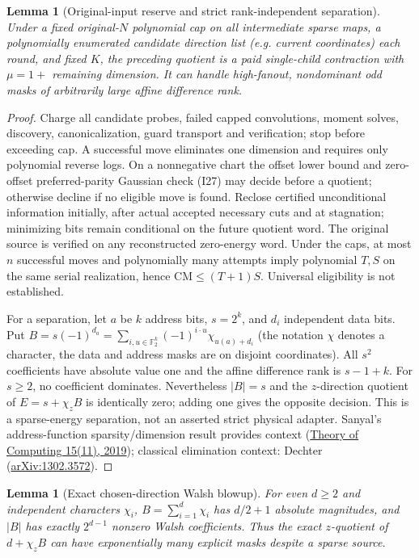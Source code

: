 \documentclass[11pt]{article}
\newtheorem{lemma}[theorem]{Lemma}
\begin{document}
\begin{lemma}[Original-input reserve and strict rank-independent separation]\label{lem:ba21-reserve}
Under a fixed original-$N$ polynomial cap on all intermediate sparse maps, a polynomially enumerated candidate direction list (e.g. current coordinates) each round, and fixed $K$, the preceding quotient is a paid single-child contraction with $\mu=1+$ remaining dimension. It can handle high-fanout, nondominant odd masks of arbitrarily large affine difference rank.
\end{lemma}
\begin{proof}
Charge all candidate probes, failed capped convolutions, moment solves, discovery, canonicalization, guard transport and verification; stop before exceeding cap. A successful move eliminates one dimension and requires only polynomial reverse logs. On a nonnegative chart the offset lower bound and zero-offset preferred-parity Gaussian check (I27) may decide before a quotient; otherwise decline if no eligible move is found. Reclose certified unconditional information initially, after actual accepted necessary cuts and at stagnation; minimizing bits remain conditional on the future quotient word. The original source is verified on any reconstructed zero-energy word. Under the caps, at most $n$ successful moves and polynomially many attempts imply polynomial $T,S$ on the same serial realization, hence $\mathrm{CM}\le(T+1)S$. Universal eligibility is not established.

For a separation, let $a$ be $k$ address bits, $s=2^k$, and $d_i$ independent data bits. Put $B=s(-1)^{d_a}=\sum_{i,u\in\mathbb F_2^k}(-1)^{i\cdot u}\chi_{u(a)+d_i}$ (the notation $\chi$ denotes a character, the data and address masks are on disjoint coordinates). All $s^2$ coefficients have absolute value one and the affine difference rank is $s-1+k$. For $s\ge2$, no coefficient dominates. Nevertheless $|B|=s$ and the $z$-direction quotient of $E=s+\chi_zB$ is identically zero; adding one gives the opposite decision. This is a sparse-energy separation, not an asserted strict physical adapter. Sanyal's address-function sparsity/dimension result provides context (\href{https://theoryofcomputing.org/articles/v015a011/}{Theory of Computing 15(11), 2019}); classical elimination context: Dechter (\href{https://arxiv.org/abs/1302.3572}{arXiv:1302.3572}).
\end{proof}
\begin{lemma}[Exact chosen-direction Walsh blowup]\label{lem:ba21-blowup}
For even $d\ge2$ and independent characters $\chi_i$, $B=\sum_{i=1}^d\chi_i$ has $d/2+1$ absolute magnitudes, and $|B|$ has exactly $2^{d-1}$ nonzero Walsh coefficients. Thus the exact $z$-quotient of $d+\chi_z B$ can have exponentially many explicit masks despite a sparse source.
\end{lemma}
\end{document}
